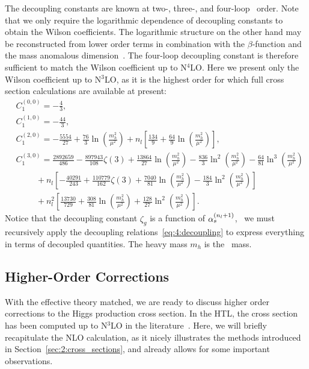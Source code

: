 The decoupling constants are known at two-, three-\cite{Chetyrkin:1997sg}, and four-loop~\cite{Schroder:2005hy, Chetyrkin:2005ia} order. Note that we only require the logarithmic dependence of decoupling constants to obtain the Wilson coefficients. The logarithmic structure on the other hand may be reconstructed from lower order terms in combination with the $\beta$-function and the mass anomalous dimension~\cite{Chetyrkin:1997un}. The four-loop decoupling constant is therefore sufficient to match the Wilson coefficient up to N${}^4$LO. Here we present only the Wilson coefficient up to N${}^3$LO, as it is the highest order for which full cross section calculations are available at present:
\begin{equation}
\begin{split}
&C_1^{(0,0)} = -\frac{4}{3}, \\
&C_1^{(1,0)} = -\frac{44}{3}, \\
&C_1^{(2,0)} = -\frac{5554}{27}  + \frac{76}{3} \ln\!\left(\frac{m_h^2}{\mu^2} \right) +  n_l \left[\frac{134}{9} + \frac{64}{9} \ln\!\left(\frac{m_h^2}{\mu^2} \right) \right], \\
&C_1^{(3,0)} = \frac{2892659}{486} - \frac{897943}{108} \zeta (3) + \frac{13864}{27} \ln\!\left(\frac{m_h^2}{\mu^2} \right) - \frac{836}{3} \ln^2\!\left(\frac{m_h^2}{\mu^2} \right) - \frac{64}{81} \ln^3\!\left(\frac{m_h^2}{\mu^2} \right) \\
& \hspace{1cm} + n_l \left[-\frac{40291}{243} + \frac{110779}{162} \zeta (3) + \frac{7040}{81} \ln\!\left(\frac{m_h^2}{\mu^2} \right) - \frac{184}{3} \ln^2\!\left(\frac{m_h^2}{\mu^2} \right) \right]    \\
& \hspace{1cm} + n_l^2 \left[ \frac{13730}{729} + \frac{308}{81} \ln\!\left(\frac{m_h^2}{\mu^2} \right) + \frac{128}{27} \ln^2\!\left(\frac{m_h^2}{\mu^2} \right) \right].
\end{split}
\end{equation}
Notice that the decoupling constant $\zeta_g$ is a function of $\alpha_s^{(n_l + 1)}$, \ie\ we must recursively apply the decoupling relations~\eqref{eq:4:decoupling} to express everything in terms of decoupled quantities. The heavy mass $m_h$ is the \MS\ mass.



\subsection{Higher-Order Corrections}
With the effective theory matched, we are ready to discuss higher order corrections to the Higgs production cross section. In the \acs{HTL}, the cross section has been computed up to N${}^3$LO in the literature~\cite{Dawson:1990zj, Harlander:2002wh, Anastasiou:2002yz, Anastasiou:2016cez}. Here, we will briefly recapitulate the \acs{NLO} calculation, as it nicely illustrates the methods introduced in Section~\ref{sec:2:cross_sections}, and already allows for some important observations.

